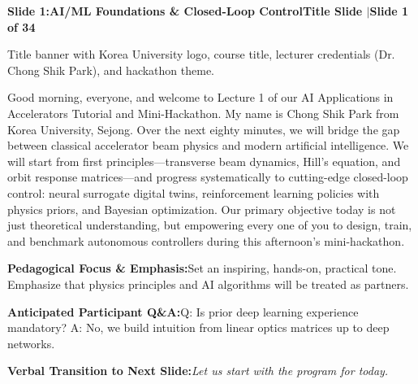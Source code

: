 \documentclass[11pt,a4paper]{article}
\begin{document}
\clearpage
\hypertarget{slide.1}{}
{}
\noindent\begin{tcolorbox}[colback=navy,colframe=navy,left=6pt,right=6pt,top=3pt,bottom=3pt,boxrule=0pt,arc=2pt]
{\large\bfseries\color{white}Slide 1:\enspace AI/ML Foundations \& Closed-Loop Control}\hfill{\footnotesize\bfseries\color{white!85!lightbg}Title Slide \enspace$|$\enspace Slide 1 of 34}
\end{tcolorbox}
\vspace{0.2em}
\begin{tcolorbox}[colback=lightbg,colframe=bordergray,title={\footnotesize\bfseries\color{darkgray}Slide Visual Blueprint},fontupper=\small,left=6pt,right=6pt,top=2.5pt,bottom=2.5pt,boxrule=0.6pt,arc=2.5pt]
Title banner with Korea University logo, course title, lecturer credentials (Dr. Chong Shik Park), and hackathon theme.
\end{tcolorbox}
\vspace{0.2em}
\begin{tcolorbox}[colback=white,colframe=primaryblue,title={\footnotesize\bfseries\color{white}Spoken Presenter Script},fontupper=\small,left=6pt,right=6pt,top=3pt,bottom=3pt,boxrule=0.8pt,arc=2.5pt]
Good morning, everyone, and welcome to Lecture 1 of our AI Applications in Accelerators Tutorial and Mini-Hackathon. My name is Chong Shik Park from Korea University, Sejong. Over the next eighty minutes, we will bridge the gap between classical accelerator beam physics and modern artificial intelligence. We will start from first principles—transverse beam dynamics, Hill's equation, and orbit response matrices—and progress systematically to cutting-edge closed-loop control: neural surrogate digital twins, reinforcement learning policies with physics priors, and Bayesian optimization. Our primary objective today is not just theoretical understanding, but empowering every one of you to design, train, and benchmark autonomous controllers during this afternoon's mini-hackathon.
\end{tcolorbox}
\vspace{0.2em}
\begin{tcolorbox}[colback=lightbg,colframe=bordergray,left=6pt,right=6pt,top=3pt,bottom=3pt,boxrule=0.6pt,arc=2.5pt]
\small
\noindent\textbf{\color{navy}Pedagogical Focus \& Emphasis:}\enspace Set an inspiring, hands-on, practical tone. Emphasize that physics principles and AI algorithms will be treated as partners.\par\vspace{0.3em}
\noindent\textbf{\color{successgreen}Anticipated Participant Q\&A:}\enspace Q: Is prior deep learning experience mandatory? A: No, we build intuition from linear optics matrices up to deep networks.\par\vspace{0.3em}
\noindent\textbf{\color{accent}Verbal Transition to Next Slide:}\enspace \emph{Let us start with the program for today.}
\end{tcolorbox}
\end{document}
